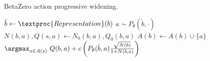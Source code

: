 \begin{algorithm}[H]
    \small
    \caption{BetaZero action progressive widening.}
    \label{alg:betazero-action-pw}
    \begin{algorithmic}[1]
            \State $\tilde{b} \leftarrow \textproc{Representation}(b)$
                \State $a \sim P_\theta(\tilde{b}, \cdot)$ 
                \State $N(b,a), Q(s,a) \leftarrow N_0(b,a), Q_0(b,a)$
                \State $A(b) \leftarrow A(b) \cup \{a\}$
            \EndIf
            \State \Return ${\displaystyle\argmax_{a \in A(s)}}\ Q(b,a) + c\left(P_\theta(\tilde{b},a)\frac{\sqrt{N(b)}}{1 + N(b,a)}\right)$ 
        \EndFunction
    \end{algorithmic}
\end{algorithm}